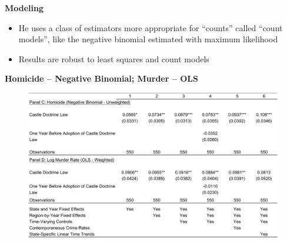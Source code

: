 \documentclass[notes=show]{beamer}
\begin{document}
\begin{frame}[plain]
\begin{center}
\textbf{Modeling}
\end{center}

\begin{itemize}
		\item He uses a class of estimators more appropriate for ``counts'' called ``count models'', like the negative binomial estimated with maximum likelihood
		\item Results are robust to least squares and count models
\end{itemize}

\end{frame}

	


\begin{frame}[plain]
	\begin{center}
	\textbf{Homicide -- Negative Binomial; Murder -- OLS}
	\end{center}
	
	\begin{figure}
	\includegraphics[scale=0.4]{./lecture_includes/cheng12.pdf}
	\end{figure}
\end{frame}
\end{document}
